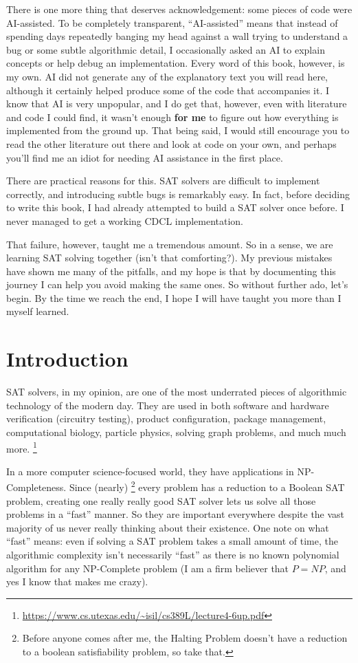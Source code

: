 \documentclass[oneside]{book}
\begin{document}
There is one more thing that deserves acknowledgement: some pieces of code were AI-assisted.
To be completely transparent, ``AI-assisted'' means that instead of spending days repeatedly 
banging my head against a wall trying to understand a bug or some subtle algorithmic detail, 
I occasionally asked an AI to explain concepts or help debug an implementation. Every word of this book, 
however, is my own. AI did not generate any of the explanatory text you will read here, 
although it certainly helped produce some of the code that accompanies it. I know that AI 
is very unpopular, and I do get that, however, even with literature and code I could find, it 
wasn't enough \textbf{for me} to figure out how everything is implemented from the ground up. 
That being said, I would still encourage you to read the other literature out there and look 
at code on your own, and perhaps you'll find me an idiot for needing AI assistance in the first 
place.

There are practical reasons for this. SAT solvers are difficult to implement correctly, 
and introducing subtle bugs is remarkably easy. In fact, before deciding to write this book, 
I had already attempted to build a SAT solver once before. I never managed to get a working CDCL 
implementation.

That failure, however, taught me a tremendous amount. So in a sense, we are learning
SAT solving together (isn't that comforting?). My previous mistakes have shown me many 
of the pitfalls, and my hope is that by documenting this journey I can help you avoid making the same ones.
So without further ado, let's begin. By the time we reach the end, I hope I will have 
taught you more than I myself learned.

\chapter{Introduction}

SAT solvers, in my opinion, are one of the most underrated pieces of algorithmic 
technology of the modern day. They are used in both software and hardware verification 
(circuitry testing), product configuration, package management, computational biology, 
 particle physics, solving graph problems, and much much more.
 \footnote{\url{https://www.cs.utexas.edu/~isil/cs389L/lecture4-6up.pdf}}

In a more computer science-focused world, they have applications in 
NP-Completeness. Since (nearly)
\footnote{Before anyone comes after me, the Halting Problem doesn't have a reduction to 
a boolean satisfiability problem, so take that.}
every problem has a reduction to a 
Boolean SAT problem, creating one really really good SAT solver lets us 
solve all those problems in a ``fast'' manner. So they are important everywhere
despite the vast majority of us never really thinking about their existence.
One note on what ``fast'' means: even if solving a SAT problem takes a small amount of time,
the algorithmic complexity isn't necessarily ``fast'' as there is no known 
polynomial algorithm for any NP-Complete problem 
(I am a firm believer that $P = NP$, and yes I know that makes me crazy).
\end{document}
